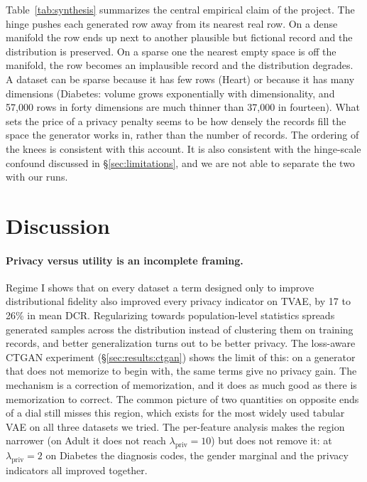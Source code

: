 \documentclass[11pt,a4paper]{article}
\newcommand{\lpriv}{\lambda_{\text{priv}}}
\begin{document}
Table~\ref{tab:synthesis} summarizes the central empirical claim of the
project. The hinge pushes each generated row away from its nearest real row.
On a dense manifold the row ends up next to another plausible but fictional
record and the distribution is preserved. On a sparse one the nearest empty
space is off the manifold, the row becomes an implausible record and the
distribution degrades. A dataset can be sparse because it has few rows (Heart)
or because it has many dimensions (Diabetes: volume grows exponentially with
dimensionality, and 57{,}000 rows in forty dimensions are much thinner than
37{,}000 in fourteen). What sets the price of a privacy penalty seems to be
how densely the records fill the space the generator works in, rather than the
number of records. The ordering of the knees is consistent with this account.
It is also consistent with the hinge-scale confound discussed in
\S\ref{sec:limitations}, and we are not able to separate the two with our
runs.

\section{Discussion}
\label{sec:discussion}

\paragraph{Privacy versus utility is an incomplete framing.}
Regime I shows that on every dataset a term designed only to improve
distributional fidelity also improved every privacy indicator on TVAE, by 17
to 26\% in mean DCR. Regularizing towards population-level statistics spreads
generated samples across the distribution instead of clustering them on
training records, and better generalization turns out to be better privacy.
The loss-aware CTGAN experiment (\S\ref{sec:results:ctgan}) shows the limit of
this: on a generator that does not memorize to begin with, the same terms give
no privacy gain. The mechanism is a correction of memorization, and it does
as much good as there is memorization to correct. The common picture of two
quantities on opposite ends of a dial still misses this region, which exists
for the most widely used tabular VAE on all three datasets we tried.
The per-feature analysis makes the region narrower (on Adult it does not
reach $\lpriv = 10$) but does not remove it: at $\lpriv = 2$ on Diabetes the
diagnosis codes, the gender marginal and the privacy indicators all improved
together.
\end{document}
